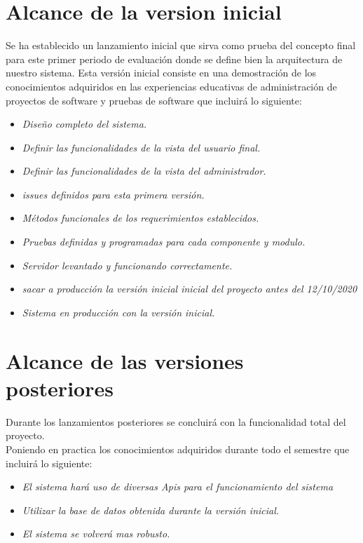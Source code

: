 \documentclass[12pt,a4paper]{book}
\begin{document}
\section{Alcance de la version inicial}
\vspace{0.5 cm}
Se ha establecido un lanzamiento inicial que sirva como prueba del concepto final para este primer periodo de evaluación donde se define bien la arquitectura de nuestro sistema.
Esta versión inicial consiste en una demostración de los conocimientos adquiridos en las experiencias educativas de administración de proyectos de software y pruebas de software que incluirá lo siguiente: \\
\vspace{0.5 cm}
\begin{itemize}
\item \textit{Diseño completo del sistema.}
\item \textit{Definir las funcionalidades de la vista del usuario final.}
\item \textit{Definir las funcionalidades de la vista del administrador.}
\item \textit{issues definidos para esta primera versión.}
\item \textit{Métodos funcionales de los requerimientos establecidos.}
\item \textit{Pruebas definidas y programadas para cada componente y modulo.}
\item \textit{Servidor levantado y funcionando correctamente.}
\item \textit{sacar a producción la versión inicial inicial del proyecto antes del 12/10/2020}
\item \textit{Sistema en producción con la versión inicial.}
\end{itemize} 
\newpage
\section{Alcance de las versiones posteriores}
\vspace{0.5 cm}
Durante los lanzamientos posteriores se concluirá con la funcionalidad total del proyecto.\\
Poniendo en practica los conocimientos adquiridos durante todo el semestre que incluirá lo siguiente: \\
\begin{itemize}
\item \textit{El sistema hará uso de diversas Apis para el funcionamiento del sistema}
\item \textit{Utilizar la base de datos obtenida durante la versión inicial.}
\item \textit{El sistema se volverá mas robusto.}
\end{itemize} 
\newpage
\end{document}

